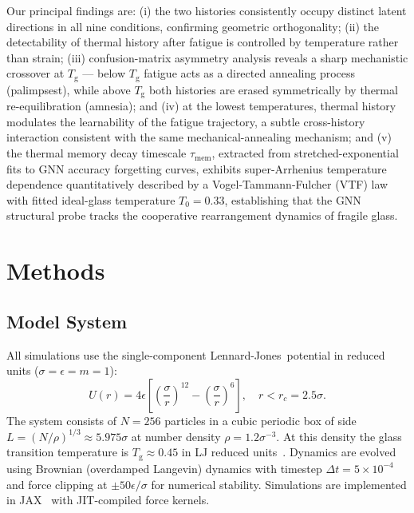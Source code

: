 \documentclass[12pt,a4paper]{article}
\newcommand{\Tg}{T_{\mathrm{g}}}
\newcommand{\LJ}{Lennard-Jones}
\newcommand{\vtau}{\tau_{\mathrm{mem}}}
\newcommand{\Tzero}{T_0}
\begin{document}
Our principal findings are:
(i) the two histories consistently occupy distinct latent directions in all nine conditions, confirming geometric orthogonality;
(ii) the detectability of thermal history after fatigue is controlled by temperature rather than strain;
(iii) confusion-matrix asymmetry analysis reveals a sharp mechanistic crossover at $\Tg$ — below $\Tg$ fatigue acts as a directed annealing process (palimpsest), while above $\Tg$ both histories are erased symmetrically by thermal re-equilibration (amnesia);
and (iv) at the lowest temperatures, thermal history modulates the learnability of the fatigue trajectory, a subtle cross-history interaction consistent with the same mechanical-annealing mechanism;
and (v) the thermal memory decay timescale $\vtau$, extracted from stretched-exponential fits to GNN accuracy forgetting curves, exhibits super-Arrhenius temperature dependence quantitatively described by a Vogel-Tammann-Fulcher (VTF) law with fitted ideal-glass temperature $\Tzero = 0.33$, establishing that the GNN structural probe tracks the cooperative rearrangement dynamics of fragile glass.
\section{Methods}
\label{sec:methods}

\subsection{Model System}
\label{sec:model}

All simulations use the single-component \LJ\ potential in reduced units ($\sigma = \epsilon = m = 1$):
\begin{equation}
U(r) = 4\epsilon \left[\left(\frac{\sigma}{r}\right)^{12} - \left(\frac{\sigma}{r}\right)^{6}\right], \quad r < r_c = 2.5\sigma.
\label{eq:LJ}
\end{equation}
The system consists of $N = 256$ particles in a cubic periodic box of side $L = (N/\rho)^{1/3} \approx 5.975\sigma$ at number density $\rho = 1.2\sigma^{-3}$.
At this density the glass transition temperature is $\Tg \approx 0.45$ in LJ reduced units~\cite{Kob1995}.
Dynamics are evolved using Brownian (overdamped Langevin) dynamics with timestep $\Delta t = 5 \times 10^{-4}$ and force clipping at $\pm 50\epsilon/\sigma$ for numerical stability.
Simulations are implemented in JAX~\cite{Bradbury2018} with JIT-compiled force kernels.
\end{document}
